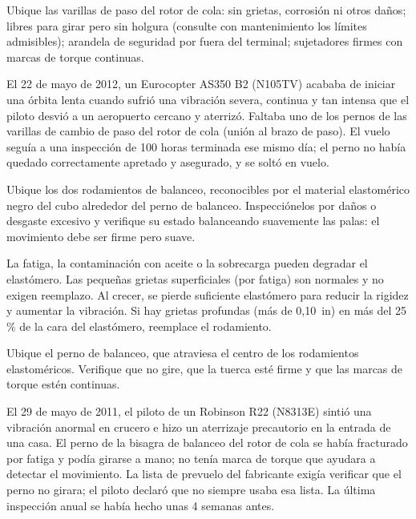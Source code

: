 Ubique las varillas de paso del rotor de cola: sin grietas, corrosión ni otros daños; libres para girar pero sin holgura (consulte con mantenimiento los límites admisibles); arandela de seguridad por fuera del terminal; sujetadores firmes con marcas de torque continuas.

\begin{caso}
El 22 de mayo de 2012, un Eurocopter AS350 B2 (N105TV) acababa de iniciar una órbita lenta cuando sufrió una vibración severa, continua y tan intensa que el piloto desvió a un aeropuerto cercano y aterrizó. Faltaba uno de los pernos de las varillas de cambio de paso del rotor de cola (unión al brazo de paso). El vuelo seguía a una inspección de 100 horas terminada ese mismo día; el perno no había quedado correctamente apretado y asegurado, y se soltó en vuelo.
\end{caso}

Ubique los dos rodamientos de balanceo, reconocibles por el material elastomérico negro del cubo alrededor del perno de balanceo. Inspecciónelos por daños o desgaste excesivo y verifique su estado balanceando suavemente las palas: el movimiento debe ser firme pero suave.

\begin{nota}
La fatiga, la contaminación con aceite o la sobrecarga pueden degradar el elastómero. Las pequeñas grietas superficiales (por fatiga) son normales y no exigen reemplazo. Al crecer, se pierde suficiente elastómero para reducir la rigidez y aumentar la vibración. Si hay grietas profundas (más de 0,10~in) en más del 25\,\% de la cara del elastómero, reemplace el rodamiento.
\end{nota}

Ubique el perno de balanceo, que atraviesa el centro de los rodamientos elastoméricos. Verifique que no gire, que la tuerca esté firme y que las marcas de torque estén continuas.

\begin{caso}
El 29 de mayo de 2011, el piloto de un Robinson R22 (N8313E) sintió una vibración anormal en crucero e hizo un aterrizaje precautorio en la entrada de una casa. El perno de la bisagra de balanceo del rotor de cola se había fracturado por fatiga y podía girarse a mano; no tenía marca de torque que ayudara a detectar el movimiento. La lista de prevuelo del fabricante exigía verificar que el perno no girara; el piloto declaró que no siempre usaba esa lista. La última inspección anual se había hecho unas 4 semanas antes.
\end{caso}

